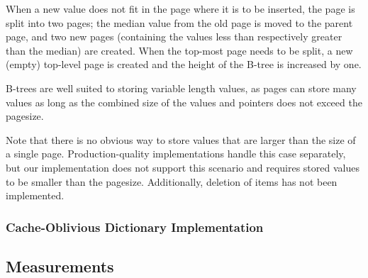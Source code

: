 \documentclass{acm_proc_article-sp}
\begin{document}
When a new value does not fit in the page where it is to be inserted,
the page is split into two pages; the median value from the old page is
moved to the parent page, and two new pages (containing the values less
than respectively greater than the median) are created. When the top-most
page needs to be split, a new (empty) top-level page is created and the height
of the B-tree is increased by one.

B-trees are well suited to storing variable length values, as pages can
store many values as long as the combined size of the values and pointers
does not exceed the pagesize.


Note that there is no obvious way to store values that are larger than the
size of a single page. Production-quality implementations handle this case
separately, but our implementation does not support this scenario and
requires stored values to be smaller than the pagesize. Additionally,
deletion of items has not been implemented.

\subsubsection{Cache-Oblivious Dictionary Implementation}


\subsection{Measurements}


\end{document}
